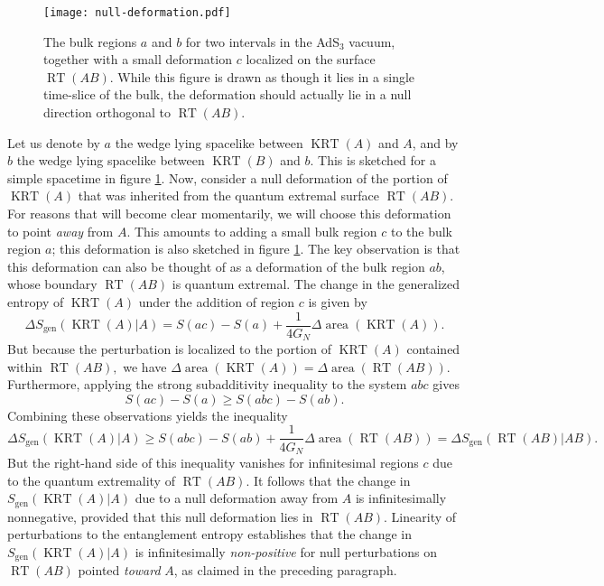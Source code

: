 \documentclass[a4paper,11pt]{article}
\newcommand{\area}{\operatorname{area}}
\newcommand{\RT}{\operatorname{RT}}
\newcommand{\KRT}{\operatorname{KRT}}
\begin{document}
\begin{figure}
	\centering
	\texttt{[image: null-deformation.pdf]}
    \caption{The bulk regions $a$ and $b$ for two intervals in the AdS$_3$ vacuum, together with a small deformation $c$ localized on the surface $\RT(AB)$. While this figure is drawn as though it lies in a single time-slice of the bulk, the deformation should actually lie in a null direction orthogonal to $\RT(AB)$.}
	\label{fig:null-deformation}
\end{figure}

Let us denote by $a$ the wedge lying spacelike between $\KRT(A)$ and $A$, and by $b$ the wedge lying spacelike between $\KRT(B)$ and $b$. This is sketched for a simple spacetime in figure \ref{fig:null-deformation}. Now, consider a null deformation of the portion of $\KRT(A)$ that was inherited from the quantum extremal surface $\RT(AB).$ For reasons that will become clear momentarily, we will choose this deformation to point \emph{away} from $A$. This amounts to adding a small bulk region $c$ to the bulk region $a$; this deformation is also sketched in figure \ref{fig:null-deformation}. The key observation is that this deformation can also be thought of as a deformation of the bulk region $ab$, whose boundary $\RT(AB)$ is quantum extremal. The change in the generalized entropy of $\KRT(A)$ under the addition of region $c$ is given by
\begin{equation}
	\Delta S_{\text{gen}}(\KRT(A)|A)
		= S(a c) - S(a) + \frac{1}{4 G_N} \Delta \area(\KRT(A)).
\end{equation}
But because the perturbation is localized to the portion of $\KRT(A)$ contained within $\RT(AB),$ we have $\Delta \area(\KRT(A)) = \Delta \area(\RT(AB)).$ Furthermore, applying the strong subadditivity inequality to the system $abc$ gives
\begin{equation}
	S(ac) - S(a) \geq S(abc) - S(ab).
\end{equation}
Combining these observations yields the inequality
\begin{equation}
	\Delta S_{\text{gen}}(\KRT(A)|A)
		\geq S(a b c) - S(a b) + \frac{1}{4 G_N} \Delta \area(\RT(AB))
		= \Delta S_{\text{gen}}(\RT(AB)|AB).
\end{equation}
But the right-hand side of this inequality vanishes for infinitesimal regions $c$ due to the quantum extremality of $\RT(AB)$. It follows that the change in $S_{\text{gen}}(\KRT(A)|A)$ due to a null deformation away from $A$ is infinitesimally nonnegative, provided that this null deformation lies in $\RT(AB)$. Linearity of perturbations to the entanglement entropy establishes that the change in $S_{\text{gen}}(\KRT(A)|A)$ is infinitesimally \emph{non-positive} for null perturbations on $\RT(AB)$ pointed \emph{toward} $A$, as claimed in the preceding paragraph.
\end{document}
